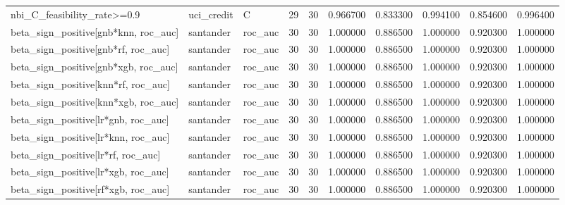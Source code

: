 \begin{longtable}{lllrrrrrrr}
nbi\_C\_feasibility\_rate>=0.9 & uci\_credit & C & 29 & 30 & 0.966700 & 0.833300 & 0.994100 & 0.854600 & 0.996400 \\
beta\_sign\_positive[gnb*knn, roc\_auc] & santander & roc\_auc & 30 & 30 & 1.000000 & 0.886500 & 1.000000 & 0.920300 & 1.000000 \\
beta\_sign\_positive[gnb*rf, roc\_auc] & santander & roc\_auc & 30 & 30 & 1.000000 & 0.886500 & 1.000000 & 0.920300 & 1.000000 \\
beta\_sign\_positive[gnb*xgb, roc\_auc] & santander & roc\_auc & 30 & 30 & 1.000000 & 0.886500 & 1.000000 & 0.920300 & 1.000000 \\
beta\_sign\_positive[knn*rf, roc\_auc] & santander & roc\_auc & 30 & 30 & 1.000000 & 0.886500 & 1.000000 & 0.920300 & 1.000000 \\
beta\_sign\_positive[knn*xgb, roc\_auc] & santander & roc\_auc & 30 & 30 & 1.000000 & 0.886500 & 1.000000 & 0.920300 & 1.000000 \\
beta\_sign\_positive[lr*gnb, roc\_auc] & santander & roc\_auc & 30 & 30 & 1.000000 & 0.886500 & 1.000000 & 0.920300 & 1.000000 \\
beta\_sign\_positive[lr*knn, roc\_auc] & santander & roc\_auc & 30 & 30 & 1.000000 & 0.886500 & 1.000000 & 0.920300 & 1.000000 \\
beta\_sign\_positive[lr*rf, roc\_auc] & santander & roc\_auc & 30 & 30 & 1.000000 & 0.886500 & 1.000000 & 0.920300 & 1.000000 \\
beta\_sign\_positive[lr*xgb, roc\_auc] & santander & roc\_auc & 30 & 30 & 1.000000 & 0.886500 & 1.000000 & 0.920300 & 1.000000 \\
beta\_sign\_positive[rf*xgb, roc\_auc] & santander & roc\_auc & 30 & 30 & 1.000000 & 0.886500 & 1.000000 & 0.920300 & 1.000000 \\
\end{longtable}\endgroup
